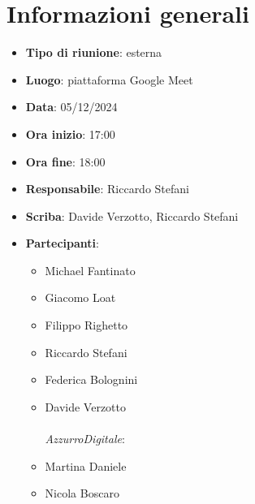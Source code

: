 


\section{Informazioni generali}

\begin{itemize}
    \item \textbf{Tipo di riunione}: esterna
    \item \textbf{Luogo}: piattaforma Google Meet
    \item \textbf{Data}: 05/12/2024
    \item \textbf{Ora inizio}: 17:00
    \item \textbf{Ora fine}: 18:00
    \item \textbf{Responsabile}: Riccardo Stefani
    \item \textbf{Scriba}: Davide Verzotto, Riccardo Stefani
    \item \textbf{Partecipanti}:
    \begin{itemize}
        \item Michael Fantinato
        \item Giacomo Loat
        \item Filippo Righetto
        \item Riccardo Stefani
        \item Federica Bolognini
        \item Davide Verzotto \\ \\
        \emph{AzzurroDigitale}:
        \item Martina Daniele
        \item Nicola Boscaro
    \end{itemize}
\end{itemize}

